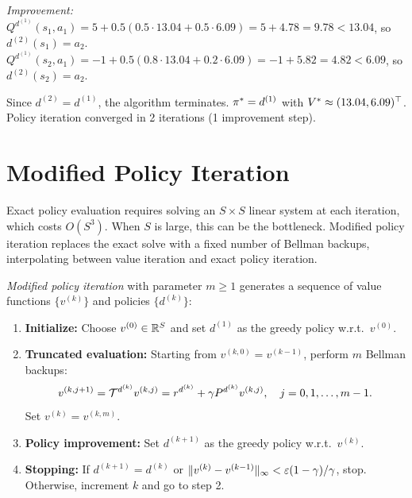 \documentclass[11pt,a4paper]{article}
\begin{document}
\begin{example}
\emph{Improvement:}
$Q^{d^{(1)}}(s_1, a_1) = 5 + 0.5(0.5 \cdot 13.04 + 0.5 \cdot 6.09)
= 5 + 4.78 = 9.78 < 13.04$, so $d^{(2)}(s_1) = a_2$.
$Q^{d^{(1)}}(s_2, a_1) = -1 + 0.5(0.8 \cdot 13.04 + 0.2 \cdot 6.09)
= -1 + 5.82 = 4.82 < 6.09$, so $d^{(2)}(s_2) = a_2$.

Since $d^{(2)} = d^{(1)}$, the algorithm terminates.
$\pi^* = d^{(1)}$ with $V^* \approx (13.04, 6.09)^\top$.
Policy iteration converged in 2 iterations (1 improvement step).
\end{example}


\section{Modified Policy Iteration}
\label{sec:modified-pi}

Exact policy evaluation requires solving an $S \times S$ linear
system at each iteration, which costs $O(S^3)$. When $S$ is large,
this can be the bottleneck. Modified policy iteration replaces the
exact solve with a fixed number of Bellman backups, interpolating
between value iteration and exact policy iteration.

\begin{definition}
\label{def:modified-pi}
\emph{Modified policy iteration} with parameter $m \geq 1$ generates
a sequence of value functions $\{v^{(k)}\}$ and policies
$\{d^{(k)}\}$:
\begin{enumerate}[nosep]
    \item \textbf{Initialize:} Choose $v^{(0)} \in \mathbb{R}^S$ and set
    $d^{(1)}$ as the greedy policy w.r.t.\ $v^{(0)}$.
    \item \textbf{Truncated evaluation:} Starting from
    $v^{(k,0)} = v^{(k-1)}$, perform $m$ Bellman backups:
    \begin{equation}
    \label{eq:trunc-eval}
        v^{(k,j+1)} = \mathcal{T}^{d^{(k)}} v^{(k,j)}
        = r^{d^{(k)}} + \gamma P^{d^{(k)}} v^{(k,j)},
        \quad j = 0, 1, \ldots, m-1.
    \end{equation}
    Set $v^{(k)} = v^{(k,m)}$.
    \item \textbf{Policy improvement:} Set $d^{(k+1)}$ as the greedy
    policy w.r.t.\ $v^{(k)}$.
    \item \textbf{Stopping:} If $d^{(k+1)} = d^{(k)}$ or
    $\|v^{(k)} - v^{(k-1)}\|_\infty < \varepsilon(1-\gamma)/
    \gamma$, stop. Otherwise, increment $k$ and go to step 2.
\end{enumerate}
\end{definition}
\end{document}
